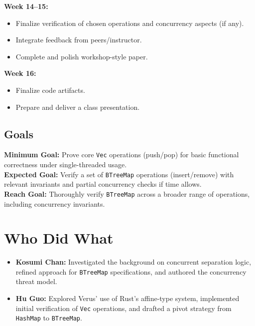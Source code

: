 \documentclass[conference]{IEEEtran}
\begin{document}
\noindent\textbf{Week 14--15:}
\begin{itemize}
\item Finalize verification of chosen operations and concurrency aspects (if any).
\item Integrate feedback from peers/instructor.
\item Complete and polish workshop-style paper.
\end{itemize}

\noindent\textbf{Week 16:}
\begin{itemize}
\item Finalize code artifacts.
\item Prepare and deliver a class presentation.
\end{itemize}

\subsection{Goals}
\noindent\textbf{Minimum Goal:} Prove core \texttt{Vec} operations (push/pop) for basic functional correctness under single-threaded usage.\\
\textbf{Expected Goal:} Verify a set of \texttt{BTreeMap} operations (insert/remove) with relevant invariants and partial concurrency checks if time allows.\\
\textbf{Reach Goal:} Thoroughly verify \texttt{BTreeMap} across a broader range of operations, including concurrency invariants.

\section{Who Did What}
\begin{itemize}
\item \textbf{Kosumi Chan:} Investigated the background on concurrent separation logic, refined approach for \texttt{BTreeMap} specifications, and authored the concurrency threat model.
\item \textbf{Hu Guo:} Explored Verus' use of Rust's affine-type system, implemented initial verification of \texttt{Vec} operations, and drafted a pivot strategy from \texttt{HashMap} to \texttt{BTreeMap}.
\end{itemize}
\end{document}
